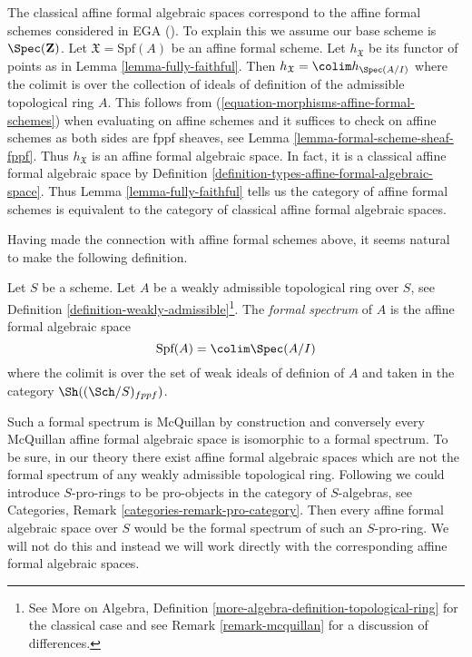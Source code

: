 \begin{remark}
\label{remark-compare-with-affine-formal-schemes}
The classical affine formal algebraic spaces correspond to the
affine formal schemes considered in EGA (\cite{EGA}). To explain this
we assume our base scheme is $\Spec(\mathbf{Z})$. Let
$\mathfrak X = \text{Spf}(A)$ be an affine formal scheme.
Let $h_\mathfrak X$ be its functor of points as in
Lemma \ref{lemma-fully-faithful}.
Then $h_\mathfrak X = \colim h_{\Spec(A/I)}$ where the colimit
is over the collection of ideals of definition of the admissible
topological ring $A$. This follows from
(\ref{equation-morphisms-affine-formal-schemes})
when evaluating on affine schemes and it suffices to check
on affine schemes as both sides are fppf sheaves, see
Lemma \ref{lemma-formal-scheme-sheaf-fppf}.
Thus $h_\mathfrak X$ is an affine formal algebraic space.
In fact, it is a classical affine formal algebraic space
by Definition \ref{definition-types-affine-formal-algebraic-space}.
Thus Lemma \ref{lemma-fully-faithful} tells us
the category of affine formal schemes is equivalent to the category
of classical affine formal algebraic spaces.
\end{remark}

\noindent
Having made the connection with affine formal schemes above,
it seems natural to make the following definition.

\begin{definition}
\label{definition-affine-formal-spectrum}
Let $S$ be a scheme. Let $A$ be a weakly admissible topological ring over
$S$, see Definition \ref{definition-weakly-admissible}\footnote{See
More on Algebra, Definition
\ref{more-algebra-definition-topological-ring}
for the classical case and see Remark \ref{remark-mcquillan}
for a discussion of differences.}.
The {\it formal spectrum} of $A$ is the affine formal algebraic space
$$
\text{Spf}(A) = \colim \Spec(A/I)
$$
where the colimit is over the set of weak ideals of definion of $A$
and taken in the category $\Sh((\Sch/S)_{fppf})$.
\end{definition}

\noindent
Such a formal spectrum is McQuillan by construction and conversely
every McQuillan affine formal algebraic space is isomorphic to a
formal spectrum. To be sure, in our theory there exist affine formal
algebraic spaces which are not the formal spectrum of any
weakly admissible topological ring.
Following \cite{Yasuda} we could introduce $S$-pro-rings
to be pro-objects in the category of $S$-algebras, see Categories,
Remark \ref{categories-remark-pro-category}. Then every
affine formal algebraic space over $S$ would be the formal spectrum of such
an $S$-pro-ring. We will not do this and instead we will work directly with the
corresponding affine formal algebraic spaces.

